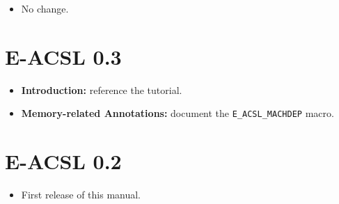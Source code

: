\begin{itemize}
\item No change.
\end{itemize}

\section*{E-ACSL 0.3}
\begin{itemize}
\item \textbf{Introduction:} reference the \eacsl tutorial.
\item \textbf{Memory-related Annotations:} document the
  \lstinline|E_ACSL_MACHDEP| macro.
\end{itemize}

\section*{E-ACSL 0.2}

\begin{itemize}
\item First release of this manual.
\end{itemize}
